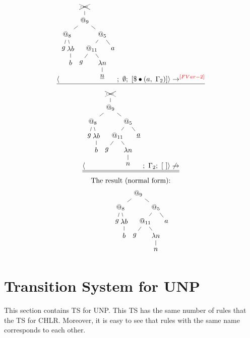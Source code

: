 \documentclass[a4paper, 10pt]{article}
\begin{document}
\begin{align*}
  \langle \begin{tikzpicture}[sibling distance=5em,level distance=2em]
    \node {\xcancel{$\dots$}}
    child { node {$@_9$}
      child { node {$@_8$}[sibling distance=1em]
        child { node {$g$}}
        child { node {$\lambda b$}
          child { node {$b$}}}}
      child { node {$@_5$}[sibling distance=3em]
        child { node {$@_{11}$}
          child { node {$g$}}
          child { node {$\lambda n$}
            child { node {$\underline{n}$}}}}
        child { node {$a$}}}};
  \end{tikzpicture};\ \emptyset;\ [ \$ \bullet (a,\ \Gamma_2) ] \rangle & \rightarrow^{\color{red}[FVar-2]}\\
  \hline
\end{align*}
\begin{align*}
  \langle \begin{tikzpicture}[sibling distance=5em,level distance=2em]
    \node {\xcancel{$\dots$}}
    child { node {$@_9$}
      child { node {$@_8$}[sibling distance=1em]
        child { node {$g$}}
        child { node {$\lambda b$}
          child { node {$b$}}}}
      child { node {$@_5$}[sibling distance=3em]
        child { node {$@_{11}$}
          child { node {$g$}}
          child { node {$\lambda n$}
            child { node {$n$}}}}
        child { node {$\underline{a}$}}}};
  \end{tikzpicture};\ \Gamma_2;\ [\ ] \rangle & \not\rightarrow\\
  \hline \hline
\end{align*}
\begin{align*}
  \textnormal{The result (normal form):}\\
  \begin{tikzpicture}[sibling distance=5em,level distance=2em]
    \node {$@_9$}
    child { node {$@_8$}[sibling distance=1em]
      child { node {$g$}}
      child { node {$\lambda b$}
        child { node {$b$}}}}
    child { node {$@_5$}[sibling distance=3em]
      child { node {$@_{11}$}
        child { node {$g$}}
        child { node {$\lambda n$}
          child { node {$n$}}}}
      child { node {$a$}}};
  \end{tikzpicture}
\end{align*}


\newpage
\section{Transition System for UNP}
This section contains TS for UNP. This TS has the same number of rules that the TS for CHLR.
Moreover, it is easy to see that rules with the same name corresponds to each other. \\ \\
\end{document}
